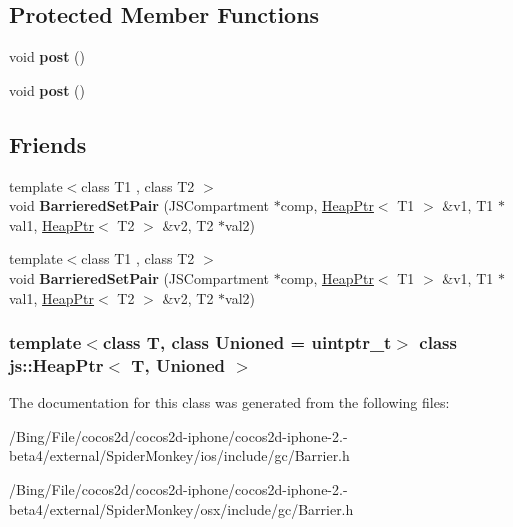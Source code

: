 \subsection*{Protected Member Functions}
\begin{DoxyCompactItemize}
\item 
\hypertarget{classjs_1_1_heap_ptr_aab909f7eb50e03d0ebb1a8603d6a2011}{void {\bfseries post} ()}\label{classjs_1_1_heap_ptr_aab909f7eb50e03d0ebb1a8603d6a2011}

\item 
\hypertarget{classjs_1_1_heap_ptr_aab909f7eb50e03d0ebb1a8603d6a2011}{void {\bfseries post} ()}\label{classjs_1_1_heap_ptr_aab909f7eb50e03d0ebb1a8603d6a2011}

\end{DoxyCompactItemize}
\subsection*{Friends}
\begin{DoxyCompactItemize}
\item 
\hypertarget{classjs_1_1_heap_ptr_a5532709548901496d09346ffcb66903c}{{\footnotesize template$<$class T1 , class T2 $>$ }\\void {\bfseries Barriered\-Set\-Pair} (J\-S\-Compartment $\ast$comp, \hyperlink{classjs_1_1_heap_ptr}{Heap\-Ptr}$<$ T1 $>$ \&v1, T1 $\ast$val1, \hyperlink{classjs_1_1_heap_ptr}{Heap\-Ptr}$<$ T2 $>$ \&v2, T2 $\ast$val2)}\label{classjs_1_1_heap_ptr_a5532709548901496d09346ffcb66903c}

\item 
\hypertarget{classjs_1_1_heap_ptr_a5532709548901496d09346ffcb66903c}{{\footnotesize template$<$class T1 , class T2 $>$ }\\void {\bfseries Barriered\-Set\-Pair} (J\-S\-Compartment $\ast$comp, \hyperlink{classjs_1_1_heap_ptr}{Heap\-Ptr}$<$ T1 $>$ \&v1, T1 $\ast$val1, \hyperlink{classjs_1_1_heap_ptr}{Heap\-Ptr}$<$ T2 $>$ \&v2, T2 $\ast$val2)}\label{classjs_1_1_heap_ptr_a5532709548901496d09346ffcb66903c}

\end{DoxyCompactItemize}
\subsubsection*{template$<$class T, class Unioned = uintptr\-\_\-t$>$ class js\-::\-Heap\-Ptr$<$ T, Unioned $>$}



The documentation for this class was generated from the following files\-:\begin{DoxyCompactItemize}
\item 
/\-Bing/\-File/cocos2d/cocos2d-\/iphone/cocos2d-\/iphone-\/2.-\/beta4/external/\-Spider\-Monkey/ios/include/gc/Barrier.\-h\item 
/\-Bing/\-File/cocos2d/cocos2d-\/iphone/cocos2d-\/iphone-\/2.-\/beta4/external/\-Spider\-Monkey/osx/include/gc/Barrier.\-h\end{DoxyCompactItemize}
